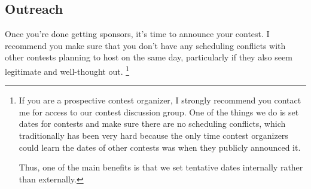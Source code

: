 \documentclass[points=false]{bounce}
\begin{document}
\subsection{Outreach}

Once you're done getting sponsors, it's time to announce your contest.
I recommend you make sure that you don't have any scheduling conflicts
with other contests planning to host on the same day,
particularly if they also seem legitimate and well-thought out.
\footnote{If you are a prospective contest organizer,
I strongly recommend you contact me for access to our contest discussion group.
One of the things we do is set dates for contests and make sure there are no scheduling conflicts,
which traditionally has been very hard because the only time contest organizers
could learn the dates of other contests
was when they publicly announced it.

Thus, one of the main benefits is that we set tentative dates internally rather than externally.}
\end{document}
